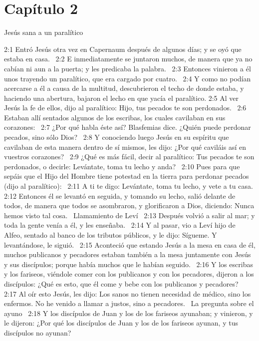 \section*{Capítulo 2}
Jesús sana a un paralítico   

2:1 Entró Jesús otra vez en Capernaum después de algunos días; y se oyó que estaba en casa.  
2:2 E inmediatamente se juntaron muchos, de manera que ya no cabían ni aun a la puerta; y les predicaba la palabra.  
2:3 Entonces vinieron a él unos trayendo un paralítico, que era cargado por cuatro.  
2:4 Y como no podían acercarse a él a causa de la multitud, descubrieron el techo de donde estaba, y haciendo una abertura, bajaron el lecho en que yacía el paralítico. 
2:5 Al ver Jesús la fe de ellos, dijo al paralítico: Hijo, tus pecados te son perdonados.  
2:6 Estaban allí sentados algunos de los escribas, los cuales cavilaban en sus corazones:  
2:7 ¿Por qué habla éste así? Blasfemias dice. ¿Quién puede perdonar pecados, sino sólo Dios?  
2:8 Y conociendo luego Jesús en su espíritu que cavilaban de esta manera dentro de sí mismos, les dijo: ¿Por qué caviláis así en vuestros corazones?  
2:9 ¿Qué es más fácil, decir al paralítico: Tus pecados te son perdonados, o decirle: Levántate, toma tu lecho y anda?  
2:10 Pues para que sepáis que el Hijo del Hombre tiene potestad en la tierra para perdonar pecados (dijo al paralítico):  
2:11 A ti te digo: Levántate, toma tu lecho, y vete a tu casa. 
2:12 Entonces él se levantó en seguida, y tomando su lecho, salió delante de todos, de manera que todos se asombraron, y glorificaron a Dios, diciendo: Nunca hemos visto tal cosa.  
Llamamiento de Leví   
2:13 Después volvió a salir al mar; y toda la gente venía a él, y les enseñaba.  
2:14 Y al pasar, vio a Leví hijo de Alfeo, sentado al banco de los tributos públicos, y le dijo: Sígueme. Y levantándose, le siguió.  
2:15 Aconteció que estando Jesús a la mesa en casa de él, muchos publicanos y pecadores estaban también a la mesa juntamente con Jesús y sus discípulos; porque había muchos que le habían seguido.  
2:16 Y los escribas y los fariseos, viéndole comer con los publicanos y con los pecadores, dijeron a los discípulos: ¿Qué es esto, que él come y bebe con los publicanos y pecadores?  
2:17 Al oír esto Jesús, les dijo: Los sanos no tienen necesidad de médico, sino los enfermos. No he venido a llamar a justos, sino a pecadores.  
La pregunta sobre el ayuno   
2:18 Y los discípulos de Juan y los de los fariseos ayunaban; y vinieron, y le dijeron: ¿Por qué los discípulos de Juan y los de los fariseos ayunan, y tus discípulos no ayunan?  
